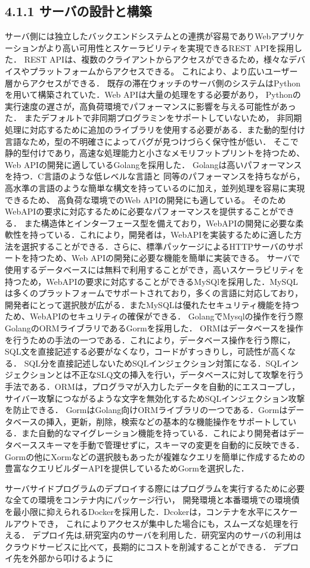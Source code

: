 



\subsection*{4.1.1 サーバの設計と構築}
サーバ側には独立したバックエンドシステムとの連携が容易でありWebアプリケーションがより高い可用性とスケーラビリティを実現できるREST APIを採用した．
REST APIは、複数のクライアントからアクセスができるため，様々なデバイスやプラットフォームからアクセスできる。
これにより、より広いユーザー層からアクセスができる．
既存の滞在ウォッチのサーバ側のシステムはPythonを用いて構築されていた．Web APIは大量の処理をする必要があり，
Pythonの実行速度の遅さが，高負荷環境でパフォーマンスに影響を与える可能性があった．
またデフォルトで非同期プログラミンをサポートしていないため，
非同期処理に対応するために追加のライブラリを使用する必要がある．また動的型付け言語なため，型の不明確さによってバグが見つけづらく保守性が低い．
そこで静的型付けであり，高速な処理能力と小さなメモリフットプリントを持つため、Web APIの開発に適しているGolangを採用した．
Golangは高いパフォーマンスを持つ．C言語のような低レベルな言語と
同等のパフォーマンスを持ちながら，高水準の言語のような簡単な構文を持っているのに加え，並列処理を容易に実現できるため、
高負荷な環境でのWeb APIの開発にも適している。
そのためWebAPIの要求に対応するために必要なパフォーマンスを提供することができる．
また構造体とインターフェース型を備えており，WebAPIの開発に必要な柔軟性を持っている．これにより，開発者は，WebAPIを実装するために適した方法を選択することができる．さらに、標準パッケージによるHTTPサーバのサポートを持つため、Web APIの開発に必要な機能を簡単に実装できる。
サーバで使用するデータベースには無料で利用することができ，高いスケーラビリティを持つため，WebAPIの要求に対応することができるMySQlを採用した．MySQLは多くのプラットフォームでサポートされており，多くの言語に対応しており，開発者にとって選択肢が広がる．またMySQLは優れたセキュリティ機能を持つため、WebAPIのセキュリティの確保ができる．
GolangでMysqlの操作を行う際GolangのORMライブラリであるGormを採用した．
ORMはデータベースを操作を行うための手法の一つである．これにより，データベース操作を行う際に，SQL文を直接記述する必要がなくなり，コードがすっきりし，可読性が高くなる．
SQL分を直接記述しないためSQLインジェクション対策になる．SQLインジェクションとは不正なSLQ文の挿入を行い，データベースに対して攻撃を行う手法である．ORMは，プログラマが入力したデータを自動的にエスコープし，サイバー攻撃につながるような文字を無効化するためSQLインジェクション攻撃を防止できる．
GormはGolang向けORMライブラリの一つである．Gormはデータベースの挿入，更新，削除，検索などの基本的な機能操作をサポートしている．また自動的なマイグレーション機能を持っている．これにより開発者はデータベーススキーマを手動で管理せずに，スキーマの変更を自動的に反映できる．
Gormの他にXormなどの選択肢もあったが複雑なクエリを簡単に作成するための豊富なクエリビルダーAPIを提供しているためGormを選択した．


サーバサイドプログラムのデプロイする際にはプログラムを実行するために必要な全ての環境をコンテナ内にパッケージ行い，
開発環境と本番環境での環境債を最小限に抑えられるDockerを採用した．Dcokerは，コンテナを水平にスケールアウトでき，
これによりアクセスが集中した場合にも，スムーズな処理を行える．
デプロイ先は,研究室内のサーバを利用した．研究室内のサーバの利用はクラウドサービスに比べて，長期的にコストを削減することができる．
デプロイ先を外部から叩けるように




